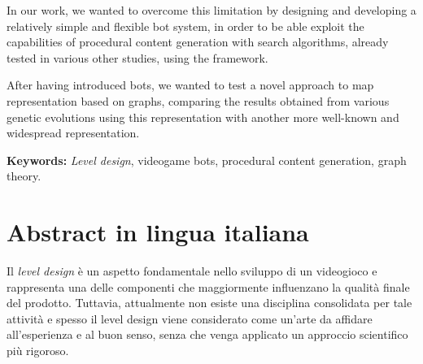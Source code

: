 \documentclass{Configuration_Files/PoliMi3i_thesis}
\begin{document}
In our work, we wanted to overcome this limitation by designing and developing a relatively simple and flexible bot system, in order to be able exploit the capabilities of procedural content generation with search algorithms, already tested in various other studies, using the framework.

After having introduced bots, we wanted to test a novel approach to map representation based on graphs, comparing the results obtained from various genetic evolutions using this representation with another more well-known and widespread representation.


\textbf{Keywords:} \textit{Level design}, videogame bots, procedural content generation, graph theory. %

\chapter*{Abstract in lingua italiana}
Il \textit{level design} è un aspetto fondamentale nello sviluppo di un videogioco e rappresenta una delle componenti che maggiormente influenzano la qualità finale del prodotto. Tuttavia, attualmente non esiste una disciplina consolidata per tale attività e spesso il level design viene considerato come un'arte da affidare all'esperienza e al buon senso, senza che venga applicato un approccio scientifico più rigoroso.
\end{document}
